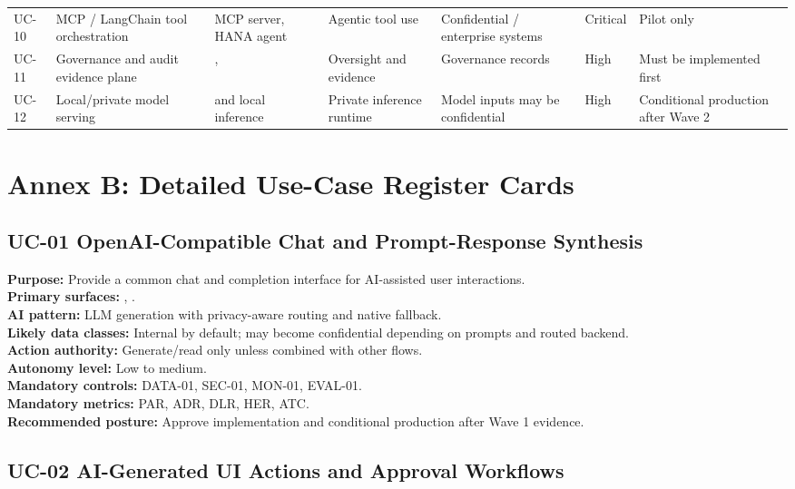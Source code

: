 \documentclass[11pt,a4paper]{article}
\begin{document}
\begin{longtable}{P{0.07\textwidth}P{0.17\textwidth}P{0.16\textwidth}P{0.12\textwidth}P{0.12\textwidth}P{0.12\textwidth}P{0.14\textwidth}}
UC-10 & MCP / LangChain tool orchestration & MCP server, HANA agent & Agentic tool use & Confidential / enterprise systems & Critical & Pilot only \\
UC-11 & Governance and audit evidence plane & ,  & Oversight and evidence & Governance records & High & Must be implemented first \\
UC-12 & Local/private model serving &  and local inference & Private inference runtime & Model inputs may be confidential & High & Conditional production after Wave 2 \\
\bottomrule
\end{longtable}

\section{Annex B: Detailed Use-Case Register Cards}

\subsection{UC-01 OpenAI-Compatible Chat and Prompt-Response Synthesis}

\textbf{Purpose:} Provide a common chat and completion interface for AI-assisted user interactions.\\
\textbf{Primary surfaces:} , .\\
\textbf{AI pattern:} LLM generation with privacy-aware routing and native fallback.\\
\textbf{Likely data classes:} Internal by default; may become confidential depending on prompts and routed backend.\\
\textbf{Action authority:} Generate/read only unless combined with other flows.\\
\textbf{Autonomy level:} Low to medium.\\
\textbf{Mandatory controls:} DATA-01, SEC-01, MON-01, EVAL-01.\\
\textbf{Mandatory metrics:} PAR, ADR, DLR, HER, ATC.\\
\textbf{Recommended posture:} Approve implementation and conditional production after Wave 1 evidence.

\subsection{UC-02 AI-Generated UI Actions and Approval Workflows}
\end{document}
